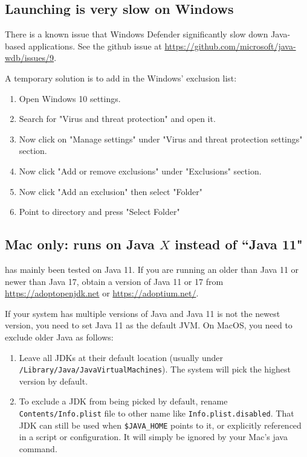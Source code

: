 \documentclass[11pt,twoside,letterpaper]{report}
\begin{document}

\subsection{Launching \hpcviewer{} is very slow on Windows}

There is a known issue that Windows Defender significantly slow down Java-based applications.
See the github issue at \url{https://github.com/microsoft/java-wdb/issues/9}.

A temporary solution is to add \hpcviewer{} in the Windows' exclusion list:
\begin{enumerate}
  \item Open Windows 10 settings.
  \item Search for "Virus and threat protection" and open it.
  \item Now click on "Manage settings" under "Virus and threat protection settings" section.
  \item Now click "Add or remove exclusions" under "Exclusions" section.
  \item Now click "Add an exclusion" then select "Folder"
  \item Point to \hpcviewer{} directory and press "Select Folder"
\end{enumerate}



\subsection{Mac only: \hpcviewer{} runs on Java $X$ instead of ``Java 11"}

\hpcviewer{} has mainly been tested on Java 11. If you are running an older than Java 11 or newer than Java 17, obtain a version of Java 11 or 17 from \url{https://adoptopenjdk.net} or \url{https://adoptium.net/}.

If your system has multiple versions of Java and Java 11 is not the newest version, you need to set Java 11 as the default JVM. On MacOS, you need to exclude older Java as follows:

\begin{enumerate}
\item Leave all JDKs at their default location (usually under \texttt{/Library/Java/JavaVirtualMachines}). The system will pick the highest version by default.
\item To exclude a JDK from being picked by default, rename \texttt{Contents/Info.plist} file to other name like \texttt{Info.plist.disabled}. That JDK can still be used when \texttt{\$JAVA\_HOME} points to it, or explicitly referenced in a script or configuration. It will simply be ignored by your Mac's java command.
\end{enumerate}
\end{document}
